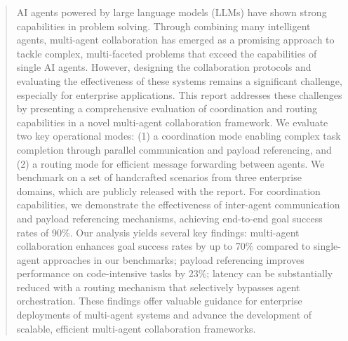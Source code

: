 \begin{abstract}
AI agents powered by large language models (LLMs) have shown strong capabilities in problem solving. Through combining many intelligent agents, multi-agent collaboration has emerged as a promising approach to tackle complex, multi-faceted problems that exceed the capabilities of single AI agents. However, designing the collaboration protocols and evaluating the effectiveness of these systems remains a significant challenge, especially for enterprise applications. This report addresses these challenges by presenting a comprehensive evaluation of coordination and routing capabilities in a novel multi-agent collaboration framework. We evaluate two key operational modes: (1) a coordination mode enabling complex task completion through parallel communication and payload referencing, and (2) a routing mode for efficient message forwarding between agents. We benchmark on a set of handcrafted scenarios from three enterprise domains, which are publicly released with the report. For coordination capabilities, we demonstrate the effectiveness of inter-agent communication and payload referencing mechanisms, achieving end-to-end goal success rates of 90\%.
 Our analysis yields several key findings: multi-agent collaboration enhances goal success rates by up to 70\% compared to single-agent approaches in our benchmarks; payload referencing improves performance on code-intensive tasks by 23\%; latency can be substantially reduced with a routing mechanism that selectively bypasses agent orchestration. These findings offer valuable guidance for enterprise deployments of multi-agent systems and advance the development of scalable, efficient multi-agent collaboration frameworks.

\end{abstract}